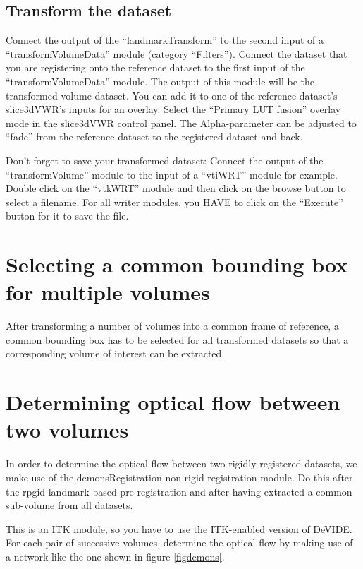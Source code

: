 \subsection{Transform the dataset}
Connect the output of the ``landmarkTransform'' to the second input of
a ``transformVolumeData'' module (category ``Filters'').  Connect the
dataset that you are registering onto the reference dataset to the
first input of the ``transformVolumeData'' module.  The output of this
module will be the transformed volume dataset.  You can add it to one
of the reference dataset's slice3dVWR's inputs for an overlay.  Select
the ``Primary LUT fusion'' overlay mode in the slice3dVWR control
panel.  The Alpha-parameter can be adjusted to ``fade'' from the
reference dataset to the registered dataset and back.

Don't forget to save your transformed dataset:  Connect the output of the
``transformVolume'' module to the input of a ``vtiWRT'' module for
example.  Double click on the ``vtkWRT'' module and then click on the browse
button to select a filename.  For all writer modules, you HAVE to click on
the ``Execute'' button for it to save the file. 

\section{Selecting a common bounding box for multiple volumes}
After transforming a number of volumes into a common frame of
reference, a common bounding box has to be selected for all
transformed datasets so that a corresponding volume of interest can be
extracted.

\section{Determining optical flow between two volumes}
In order to determine the optical flow between two rigidly registered
datasets, we make use of the demonsRegistration non-rigid registration
module.  Do this after the rpgid landmark-based pre-registration and
after having extracted a common sub-volume from all datasets.

This is an ITK module, so you have to use the ITK-enabled version of
DeVIDE.  For each pair of successive volumes, determine the optical
flow by making use of a network like the one shown in figure
\ref{figdemons}.

